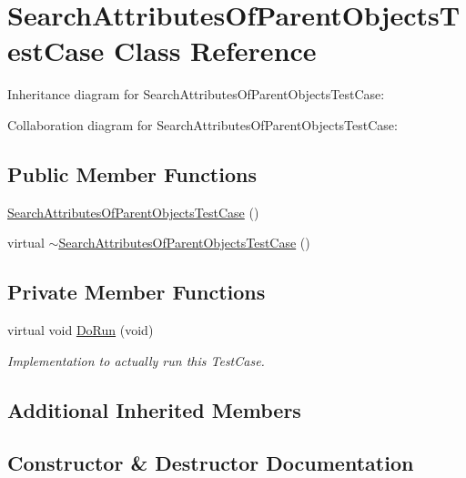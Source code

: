 \hypertarget{classSearchAttributesOfParentObjectsTestCase}{}\section{Search\+Attributes\+Of\+Parent\+Objects\+Test\+Case Class Reference}
\label{classSearchAttributesOfParentObjectsTestCase}


Inheritance diagram for Search\+Attributes\+Of\+Parent\+Objects\+Test\+Case\+:


Collaboration diagram for Search\+Attributes\+Of\+Parent\+Objects\+Test\+Case\+:
\subsection*{Public Member Functions}
\begin{DoxyCompactItemize}
\item 
\hyperlink{classSearchAttributesOfParentObjectsTestCase_aad0b3ccd53297b25c62e5734e9ea5d37}{Search\+Attributes\+Of\+Parent\+Objects\+Test\+Case} ()
\item 
virtual \hyperlink{classSearchAttributesOfParentObjectsTestCase_ace161b0f1a18d819ddce394add4243ef}{$\sim$\+Search\+Attributes\+Of\+Parent\+Objects\+Test\+Case} ()
\end{DoxyCompactItemize}
\subsection*{Private Member Functions}
\begin{DoxyCompactItemize}
\item 
virtual void \hyperlink{classSearchAttributesOfParentObjectsTestCase_aba3b7703d538d2d596fc02e0a99d82ab}{Do\+Run} (void)
\begin{DoxyCompactList}\small\item\em Implementation to actually run this Test\+Case. \end{DoxyCompactList}\end{DoxyCompactItemize}
\subsection*{Additional Inherited Members}


\subsection{Constructor \& Destructor Documentation}

